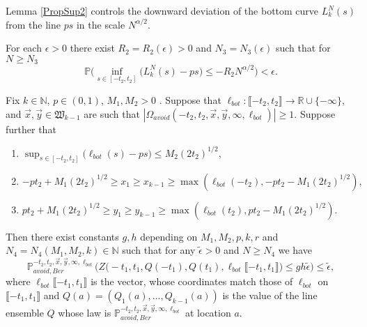 Lemma \ref{PropSup2} controls the downward deviation of the bottom curve $L^N_k(s)$ from the line $ps$ in the scale $N^{\alpha/2}$.
\begin{lemma}\label{PropSup2} For each $\epsilon > 0$ there exist $R_2=R_2( \epsilon) > 0$ and $N_3=N_3(\epsilon)$ such that for $N \geq N_3$
$$\mathbb{P}\Big( \inf_{s \in [ -t_2, t_2 ]}\big(L^N_k(s) - p s \big) \leq - R_2N^{\alpha/2} \Big) < \epsilon.$$
\end{lemma}

\begin{lemma}\label{LemmaAP1} Fix $k \in \mathbb{N}$, $p \in (0,1)$, $M_1, M_2 > 0$ . Suppose that $\ell_{bot}: \llbracket -t_2, t_2 \rrbracket \rightarrow \mathbb{R} \cup \{ - \infty \}$, and $\vec{x}, \vec{y} \in \mathfrak{W}_{k-1}$ are such that $|\Omega_{avoid}(-t_2, t_2, \vec{x}, \vec{y}, \infty, \ell_{bot})| \geq 1$. Suppose further that
	\begin{enumerate}
		\item $\sup_{s \in [- t_2,t_2]}\big(\ell_{bot}(s)  - ps \big)  \leq M_2 (2t_2)^{1/2}$,
		\item  $-pt_2 + M_1 (2t_2)^{1/2} \geq  x_1 \geq  x_{k-1} \geq \max\left(\ell_{bot}(-t_2), -pt_2- M_1 (2t_2)^{1/2}\right),$
		\item $pt_2 + M_1 (2t_2)^{1/2} \geq y_1 \geq y_{k-1} \geq  \max \left( \ell_{bot}(t_2),  p t_2- M_1(2t_2)^{1/2} \right).$
	\end{enumerate}
	Then there exist constants $g,h$ depending on $ M_1, M_2, p , k, r$ and $N_4 = N_4(M_1,M_2,k ) \in \mathbb{N}$  such that for any $\tilde{\epsilon}  > 0$ and $N \geq N_4$ we have
	\begin{equation}\label{eqn60}
	\mathbb{P}^{-t_2, t_2, \vec{x},\vec{y}, \infty, \ell_{bot} }_{avoid, Ber} \Big( Z\big(  -t_1, t_1, Q(-t_1) ,Q(t_1), \ell_{bot}\llbracket -t_1, t_1\rrbracket\big) \leq  gh \tilde{\epsilon}   \Big)  \leq \tilde{\epsilon},
	\end{equation}
	where $\ell_{bot}\llbracket -t_1, t_1\rrbracket$ is the vector, whose coordinates match those of $\ell_{bot}$ on $\llbracket -t_1, t_1\rrbracket$ and $Q(a) = (Q_1(a), \dots, Q_{k-1}(a))$ is the value of the line ensemble $Q$ whose law is $\mathbb{P}^{-t_2, t_2, \vec{x},\vec{y}, \infty, \ell_{bot} }_{avoid, Ber}$ at location $a$.
\end{lemma}


